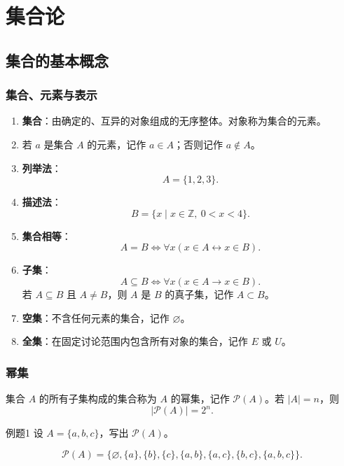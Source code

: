 \section{集合论}

\subsection{集合的基本概念}

\subsubsection{集合、元素与表示}

\begin{enumerate}
	\item \textbf{集合}：由确定的、互异的对象组成的无序整体。对象称为集合的元素。
	\item 若 \(a\) 是集合 \(A\) 的元素，记作 \(a\in A\)；否则记作 \(a\notin A\)。
	\item \textbf{列举法}：
	\[
	A=\{1,2,3\}.
	\]
	\item \textbf{描述法}：
	\[
	B=\{x\mid x\in\mathbb{Z},\ 0<x<4\}.
	\]
	\item \textbf{集合相等}：
	\[
	A=B\Leftrightarrow \forall x(x\in A\leftrightarrow x\in B).
	\]
	\item \textbf{子集}：
	\[
	A\subseteq B\Leftrightarrow \forall x(x\in A\to x\in B).
	\]
	若 \(A\subseteq B\) 且 \(A\ne B\)，则 \(A\) 是 \(B\) 的真子集，记作 \(A\subset B\)。
	\item \textbf{空集}：不含任何元素的集合，记作 \(\varnothing\)。
	\item \textbf{全集}：在固定讨论范围内包含所有对象的集合，记作 \(E\) 或 \(U\)。
\end{enumerate}

\subsubsection{幂集}

集合 \(A\) 的所有子集构成的集合称为 \(A\) 的幂集，记作 \(\mathcal{P}(A)\)。若 \(|A|=n\)，则
\[
|\mathcal{P}(A)|=2^n.
\]

\begin{question}{例题1}
	设 \(A=\{a,b,c\}\)，写出 \(\mathcal{P}(A)\)。
	
	\begin{solution}
	\[
	\mathcal{P}(A)=\{\varnothing,\{a\},\{b\},\{c\},\{a,b\},\{a,c\},\{b,c\},\{a,b,c\}\}.
	\]
	\end{solution}
\end{question}

